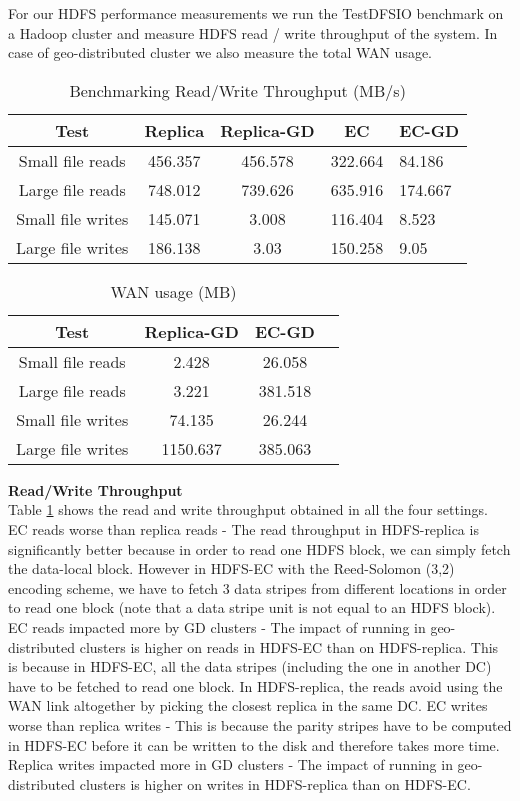 \documentclass{sig-alternate-05-2015}
\begin{document}
For our HDFS performance measurements we run the TestDFSIO benchmark on a Hadoop cluster and measure HDFS read / write throughput of the system. In case of geo-distributed cluster we also measure the total WAN usage. 

\begin{table}
\centering
\caption{Benchmarking Read/Write Throughput (MB/s)}\label{tput:table}
\begin{tabular}{|c|c|c|c|l|} \hline
Test&Replica&Replica-GD&EC&EC-GD\\ \hline
Small file reads&456.357&456.578&322.664&84.186\\ \hline
Large file reads&748.012&739.626&635.916&174.667\\ \hline
Small file writes&145.071&3.008&116.404&8.523\\ \hline
Large file writes&186.138&3.03&150.258 & 9.05 \\

\hline\end{tabular}
\end{table}
\begin{table}
\centering
\label{wan:table}
\begin{tabular}{|c|c|c|l|} \hline
Test&Replica-GD&EC-GD\\ \hline
Small file reads&2.428&26.058\\ \hline
Large file reads&3.221&381.518\\ \hline
Small file writes&74.135&26.244\\ \hline
Large file writes&1150.637&385.063 \\

\hline\end{tabular}
\caption{WAN usage (MB)}
\end{table}

\textbf{Read/Write Throughput} \\

Table \ref{tput:table} shows the read and write throughput obtained in all the four settings. EC reads worse than replica reads - The read throughput in HDFS-replica is significantly better because in order to read one HDFS block, we can simply fetch the data-local block. However in HDFS-EC with the Reed-Solomon (3,2) encoding scheme, we have to fetch 3 data stripes from different locations in order to read one block (note that a data stripe unit is not equal to an HDFS block). 
EC reads impacted more by GD clusters - The impact of running in geo-distributed clusters is higher on reads in HDFS-EC than on HDFS-replica. This is because in HDFS-EC, all the data stripes (including the one in another DC) have to be fetched to read one block. In HDFS-replica, the reads avoid using the WAN link altogether by picking the closest replica in the same DC.
EC writes worse than replica writes - This is because the parity stripes have to be computed in HDFS-EC before it can be written to the disk and therefore takes more time.
Replica writes impacted more in GD clusters - The impact of running in geo-distributed clusters is higher on writes in HDFS-replica than on HDFS-EC. \\
\end{document}
